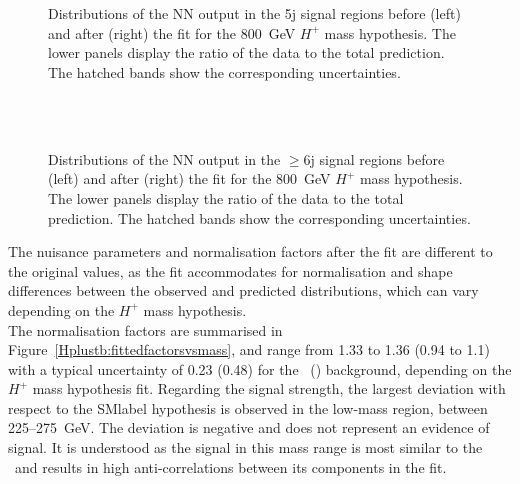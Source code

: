 \begin{figure}[htb]
    \RawFloats
    \centering
    \\
    \\
    \caption{Distributions of the NN output in the 5j signal regions before (left) and after (right) the fit for the 800~GeV $H^+$ mass hypothesis. The lower panels display the ratio of the data to the total prediction. The hatched bands show the corresponding uncertainties.
    }
    \label{Hplustb:prepost8005j}
\end{figure}

\begin{figure}[htb]
    \RawFloats
    \centering
    \\
    \\
    \caption{Distributions of the NN output in the $\geq$6j signal regions before (left) and after (right) the fit for the 800~GeV $H^+$ mass hypothesis. The lower panels display the ratio of the data to the total prediction. The hatched bands show the corresponding uncertainties.
    }
    \label{Hplustb:prepost8006j}
\end{figure}
\clearpage

The nuisance parameters and normalisation factors after the fit are different to the original values, as the fit accommodates for normalisation and shape differences between the observed and predicted distributions, which can vary depending on the $H^+$ mass hypothesis.\\

The normalisation factors are summarised in Figure~\ref{Hplustb:fittedfactorsvsmass}, and range from 1.33 to 1.36 (0.94 to 1.1) with a typical uncertainty of 0.23 (0.48) for the \ttb\ (\ttc) background, depending on the $H^+$ mass hypothesis fit. Regarding the signal strength, the largest deviation with respect to the \acrshort{SMlabel} hypothesis is observed in the low-mass region, between 225--275~GeV. The deviation is negative and does not represent an evidence of signal. It is understood as the signal in this mass range is most similar to the \ttHF\ and results in high anti-correlations between its components in the fit.\\

